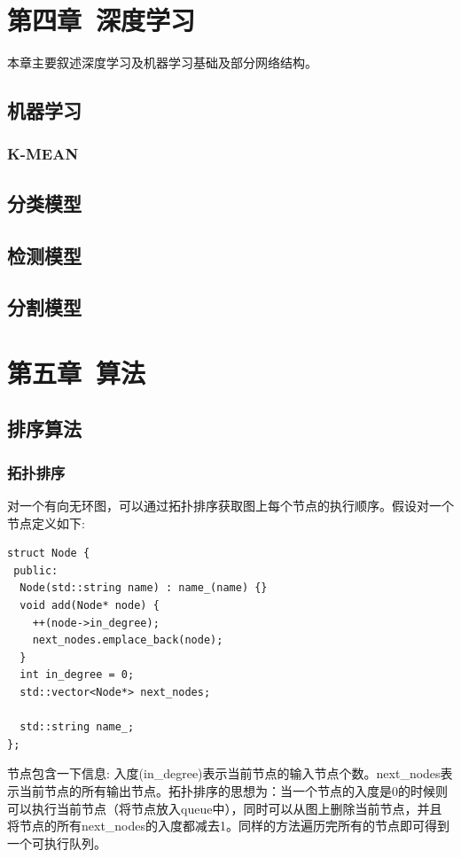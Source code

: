 \documentclass[12pt]{book}
\begin{document}
\fancyhead{}

\chapter{第四章\ 深度学习}
本章主要叙述深度学习及机器学习基础及部分网络结构。

\section{机器学习}
\subsection{K-MEAN}
\section{分类模型}
\section{检测模型}
\section{分割模型}

\newpage

\fancyhead{}

\chapter{第五章\ 算法}
\section{排序算法}
\subsection{拓扑排序}
对一个有向无环图，可以通过拓扑排序获取图上每个节点的执行顺序。假设对一个节点定义如下:
\begin{lstlisting}
struct Node {
 public:
  Node(std::string name) : name_(name) {}
  void add(Node* node) {
	++(node->in_degree);
	next_nodes.emplace_back(node);
  }
  int in_degree = 0;
  std::vector<Node*> next_nodes;
	
  std::string name_;
};
\end{lstlisting}
节点包含一下信息: 入度(in\_degree)表示当前节点的输入节点个数。next\_nodes表示当前节点的所有输出节点。拓扑排序的思想为：当一个节点的入度是0的时候则可以执行当前节点（将节点放入queue中），同时可以从图上删除当前节点，并且将节点的所有next\_nodes的入度都减去1。同样的方法遍历完所有的节点即可得到一个可执行队列。
\end{document}
